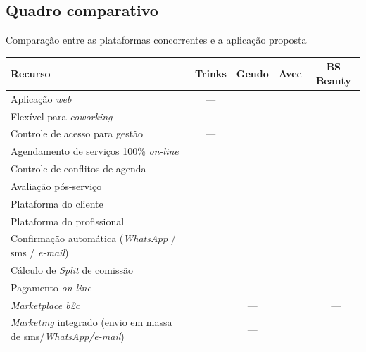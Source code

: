 
\subsection{Quadro comparativo}

\begin{quadro}[htb]
	\caption{\label{frame:comparativo_concorrência}Comparação entre as plataformas concorrentes e a aplicação proposta}
	\footnotesize
	\setlength{\tabcolsep}{4pt}
	\begin{tabular}{|p{6.8cm}|c|c|c|c|}
		\hline
		\textbf{Recurso}                                   & \textbf{Trinks} & \textbf{Gendo} & \textbf{Avec} & \textbf{BS Beauty}\\ \hline 
		Aplicação \textit{web}  & — & \checkmark & \checkmark & \checkmark \\ \hline
		Flexível para \emph{coworking}  & — & \checkmark & \checkmark & \checkmark \\ \hline
		Controle de acesso para gestão  & — & \checkmark  & \checkmark & \checkmark \\ \hline
		Agendamento de serviços 100\% \emph{on-line} & \checkmark & \checkmark & \checkmark & \checkmark \\ \hline
		Controle de conflitos de agenda                    & \checkmark & \checkmark & \checkmark & \checkmark \\ \hline
		Avaliação pós-serviço  & \checkmark & \checkmark  & \checkmark  & \checkmark \\ \hline
		Plataforma do cliente                               & \checkmark & \checkmark & \checkmark & \checkmark \\ \hline
		Plataforma do profissional                                      & \checkmark & \checkmark & \checkmark & \checkmark \\ \hline
		Confirmação automática (\emph{WhatsApp} / \gls{sms} / \emph{e-mail})                    & \checkmark & \checkmark & \checkmark & \checkmark \\ \hline
		Cálculo de \emph{Split} de comissão      & \checkmark & \checkmark & \checkmark & \checkmark  \\ \hline
		Pagamento \emph{on-line}                 & \checkmark & — & \checkmark & \ — \\ \hline
		\emph{\emph{Marketplace} \gls{b2c}}                         & \checkmark & — & \checkmark & \ — \\ \hline
		\emph{Marketing} integrado (envio em massa de \gls{sms}/\emph{WhatsApp/e-mail})  & \checkmark & — & \checkmark & \checkmark \\ \hline

\end{tabular}
\end{quadro}

